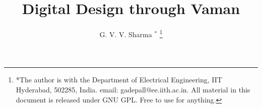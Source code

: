 \documentclass[journal,12pt,twocolumn]{IEEEtran}
\renewcommand\thesection{\arabic{section}}
\begin{document}
\let\StandardTheFigure\thefigure
\let\vec\mathbf
\renewcommand{\thefigure}{\thesection}



\def\putbox#1#2#3{\makebox[0in][l]{\makebox[#1][l]{}\raisebox{\baselineskip}[0in][0in]{\raisebox{#2}[0in][0in]{#3}}}}
     \def\rightbox#1{\makebox[0in][r]{#1}}
     \def\centbox#1{\makebox[0in]{#1}}
     \def\topbox#1{\raisebox{-\baselineskip}[0in][0in]{#1}}
     \def\midbox#1{\raisebox{-0.5\baselineskip}[0in][0in]{#1}}

\vspace{3cm}

\title{
Digital Design through Vaman
}
\author{ G. V. V. Sharma $^{*}$%
	\thanks{*The author is with the Department of Electrical Engineering, IIT Hyderabad, 502285, India. email: gadepall@ee.iith.ac.in.  All material in this document is released under GNU GPL.  Free to use for anything.}
	
}	


%
%
%

% 
%
\end{document}

